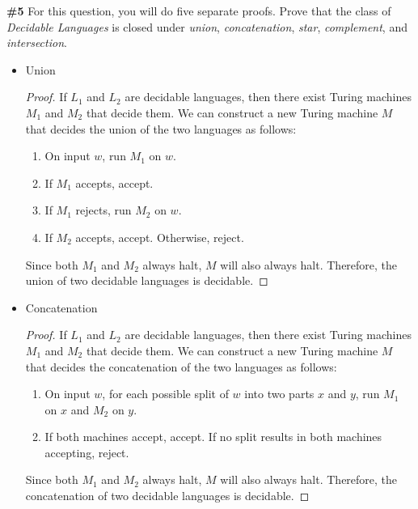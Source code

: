 \documentclass{article}
\newcommand{\problem}[1]{\textbf{\##1}}
\newcommand{\prob}[1]{\problem{#1}}
\begin{document}
\pagebreak

\prob{5} For this question, you will do five separate proofs. Prove that the class of \emph{Decidable Languages} is closed under \emph{union}, \emph{concatenation}, \emph{star}, \emph{complement}, and \emph{intersection}.

\begin{itemize}
    \item Union
    
    \begin{proof}
        If $L_1$ and $L_2$ are decidable languages, then there exist Turing machines $M_1$ and $M_2$ that decide them. We can construct a new Turing machine $M$ that decides the union of the two languages as follows:
        \begin{enumerate}
            \item On input $w$, run $M_1$ on $w$.
            \item If $M_1$ accepts, accept.
            \item If $M_1$ rejects, run $M_2$ on $w$.
            \item If $M_2$ accepts, accept. Otherwise, reject.
        \end{enumerate}

        Since both $M_1$ and $M_2$ always halt, $M$ will also always halt. Therefore, the union of two decidable languages is decidable.
    \end{proof}

    \item Concatenation
    
    \begin{proof}
        If $L_1$ and $L_2$ are decidable languages, then there exist Turing machines $M_1$ and $M_2$ that decide them. We can construct a new Turing machine $M$ that decides the concatenation of the two languages as follows:
        \begin{enumerate}
            \item On input $w$, for each possible split of $w$ into two parts $x$ and $y$, run $M_1$ on $x$ and $M_2$ on $y$.
            \item If both machines accept, accept. If no split results in both machines accepting, reject.
        \end{enumerate}

        Since both $M_1$ and $M_2$ always halt, $M$ will also always halt. Therefore, the concatenation of two decidable languages is decidable.
    \end{proof}


\end{itemize}
\end{document}

